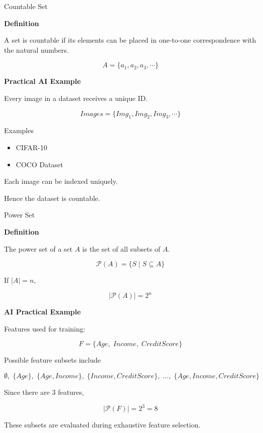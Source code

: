 \documentclass[aspectratio=169]{beamer}
\begin{document}
\begin{frame}{Countable Set}

\textbf{Definition}

A set is countable if its elements can be placed in one-to-one correspondence with the natural numbers.

\vspace{0.3cm}

\[
A=\{a_1,a_2,a_3,\cdots\}
\]

\vspace{0.4cm}

\textbf{Practical AI Example}

Every image in a dataset receives a unique ID.

\[
Images=
\{
Img_1,
Img_2,
Img_3,
\cdots
\}
\]

Examples

\begin{itemize}
\item CIFAR-10
\item COCO Dataset
\end{itemize}

Each image can be indexed uniquely.

Hence the dataset is countable.

\end{frame}

\begin{frame}{Power Set}

\textbf{Definition}

The power set of a set \(A\) is the set of all subsets of \(A\).

\[
\mathcal{P}(A)=\{S\mid S\subseteq A\}
\]

If \(|A|=n\),

\[
|\mathcal{P}(A)|=2^n
\]

\vspace{0.3cm}

\textbf{AI Practical Example}

Features used for training:

\[
F=\{Age,\;Income,\;CreditScore\}
\]

Possible feature subsets include

\[
\emptyset,\;
\{Age\},\;
\{Age,Income\},\;
\{Income,CreditScore\},\;
\ldots,\;
\{Age,Income,CreditScore\}
\]

Since there are 3 features,

\[
|\mathcal{P}(F)|=2^3=8
\]

These subsets are evaluated during exhaustive feature selection.

\end{frame}
\end{document}
